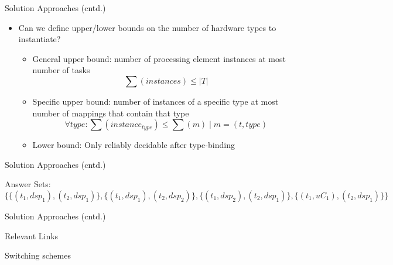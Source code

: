 \documentclass[11pt]{beamer}
\begin{document}
\begin{frame}{Solution Approaches (cntd.)}
  \label{slide:bounds}
  \begin{itemize} 
    \item Can we define upper/lower bounds on the number of hardware types to instantiate?
    \begin{itemize}
      \item General upper bound: number of processing element instances at most number of tasks \[\sum(instances)\leq \vert T\vert\]
      \item Specific upper bound: number of instances of a specific type at most number of mappings that contain that type \[\forall type: \sum(instance_{type}) \leq \sum(m)\mid m=(t, type)\]
      \item Lower bound: Only reliably decidable after type-binding
    \end{itemize}
  \end{itemize}
\end{frame}

\begin{frame}[fragile]{Solution Approaches (cntd.)}
  
   Answer Sets:
  {\tiny
  \[\{\{(t_1,dsp_1),(t_2,dsp_1)\},\{(t_1,dsp_1),(t_2,dsp_2)\},\{(t_1,dsp_2),(t_2,dsp_1)\},\{(t_1,uC_1),(t_2,dsp_1)\}\}\]
  }
\end{frame}

\begin{frame}{Solution Approaches (cntd.)}
  
\end{frame}


\begin{frame}{Relevant Links}
\end{frame}

\begin{frame}{Switching schemes}
\end{frame}
\end{document}
